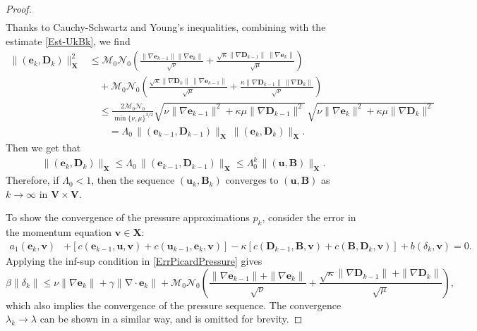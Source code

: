 \documentclass[3p]{elsarticle}
\def\V#1{\mathbf{#1}}
\def\VX{\mathbf{X}}
\newcommand{\Mbd}{\mathcal{M}}
\newcommand{\Nbd}{\mathcal{N}}
\newcommand{\divergence}{\mathrm{\nabla \cdot}}
\begin{document}
\begin{proof}
\begin{equation*}
\begin{aligned}
\end{aligned}
\end{equation*}
Thanks to Cauchy-Schwartz and Young's inequalities, combining with the estimate \eqref{Est-UkBk}, we find 
\begin{align*}
\|(\V{e}_k,\V{D}_k)\|^2_\VX
 & \le 
  \Mbd_0 \Nbd_0 \left(\frac{\|\nabla \V{e}_{k-1}\|
\|\nabla \V{e}_{k}\|}{\sqrt{\nu}}
 + 
  \frac{\sqrt{\kappa}\|\nabla \V{D}_{k-1}\| \, \|\nabla \V{e}_{k}\|}{\sqrt{\mu}} \right)
\\ & \quad +
   \Mbd_0 \Nbd_0 \left( \frac{\sqrt{\kappa}\|\nabla \V{D}_{k}\| \, \|\nabla \V{e}_{k-1}\|}{\sqrt{\mu}}
+  \frac{\kappa \|\nabla \V{D}_{k-1}\| \, \|\nabla \V{D}_{k}\|}{\sqrt{\nu}} \right)
\\ & \quad \le 
\frac{2\Mbd_0 \Nbd_0}{\min\{\nu,\mu\}^{3/2}}
\sqrt{\nu \|\nabla \V{e}_{k-1} \|^2 + \kappa \mu \|\nabla \V{D}_{k-1} \|^2 }\,
\sqrt{\nu \|\nabla \V{e}_{k} \|^2 + \kappa \mu \|\nabla \V{D}_{k} \|^2 } 
\\ &  \qquad = 
 \Lambda_0\, \|(\V{e}_{k-1},\V{D}_{k-1})\|_\VX \, \|(\V{e}_k,\V{D}_k)\|_\VX.
\end{align*}
Then we get that
\begin{align*}
\|(\V{e}_k,\V{D}_k)\|_\VX \le \Lambda_0\, \|(\V{e}_{k-1},\V{D}_{k-1})\|_\VX \le \Lambda_0^k \, \|(\V{u},\V{B})\|_\VX.
\end{align*}
Therefore, if $\Lambda_0<1 $, then the sequence $(\V{u}_k,\V{B}_k)$ converges to $(\V{u},\V{B}) $ as $k \rightarrow \infty$ in $\V{V} \times \V{V}$.

To show the convergence of the pressure approximations $p_k$, consider the error in the momentum equation $ \V{v} \in \V{X}$:
\begin{equation}\label{ErrPicardPressure}
\begin{aligned}
 a_1 (\V{e}_{k},\V{v})
& + [c(\V{e}_{k-1},\V{u},\V{v})  
+c(\V{u}_{k-1},\V{e}_{k},\V{v})]
- \kappa[c(\V{D}_{k-1},\V{B},\V{v})  
+c(\V{B},\V{D}_{k},\V{v})]
+ b(\delta_{k},\V{v})
 = 0. 
\end{aligned}
\end{equation}
Applying the inf-sup condition in \eqref{ErrPicardPressure} gives
\begin{equation}
    \label{ErrPicardPressure1}
     \beta \| \delta_k \| \le \nu\|\nabla \V{e}_{k}\| + \gamma \|\divergence \V{e}_{k}\| + \Mbd_0 \Nbd_0  \left(\frac{\|\nabla \V{e}_{k-1}\| +
\|\nabla \V{e}_{k}\|}{\sqrt{\nu}}
 + \frac{\sqrt{\kappa}\|\nabla \V{D}_{k-1}\| \ + \|\nabla \V{D}_{k}\|}{\sqrt{\mu}} \right),
\end{equation}
which also implies the convergence of the pressure sequence. The convergence  $\lambda_k \rightarrow \lambda$ can be shown in a similar way, and is omitted for brevity.
\end{proof}
\end{document}
